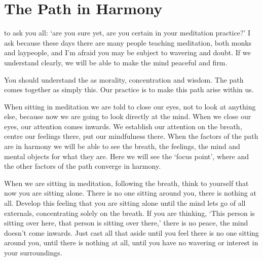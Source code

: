 
\chapter{The Path in Harmony}

\vspace*{0.5\baselineskip}
 to ask you all: `are you sure yet, are you certain in your meditation practice?' I ask because these days there are many people teaching meditation, both monks and laypeople, and I'm afraid you may be subject to wavering and doubt. If we understand clearly, we will be able to make the mind peaceful and firm.

You should understand the  as morality, concentration and wisdom. The path comes together as simply this. Our practice is to make this path arise within us.

When sitting in meditation we are told to close our eyes, not to look at anything else, because now we are going to look directly at the mind. When we close our eyes, our attention comes inwards. We establish our attention on the breath, centre our feelings there, put our mindfulness there. When the factors of the path are in harmony we will be able to see the breath, the feelings, the mind and mental objects for what they are. Here we will see the `focus point', where  and the other factors of the path converge in harmony.

When we are sitting in meditation, following the breath, think to yourself that now you are sitting alone. There is no one sitting around you, there is nothing at all. Develop this feeling that you are sitting alone until the mind lets go of all externals, concentrating solely on the breath. If you are thinking, `This person is sitting over here, that person is sitting over there,' there is no peace, the mind doesn't come inwards. Just cast all that aside until you feel there is no one sitting around you, until there is nothing at all, until you have no wavering or interest in your surroundings.

